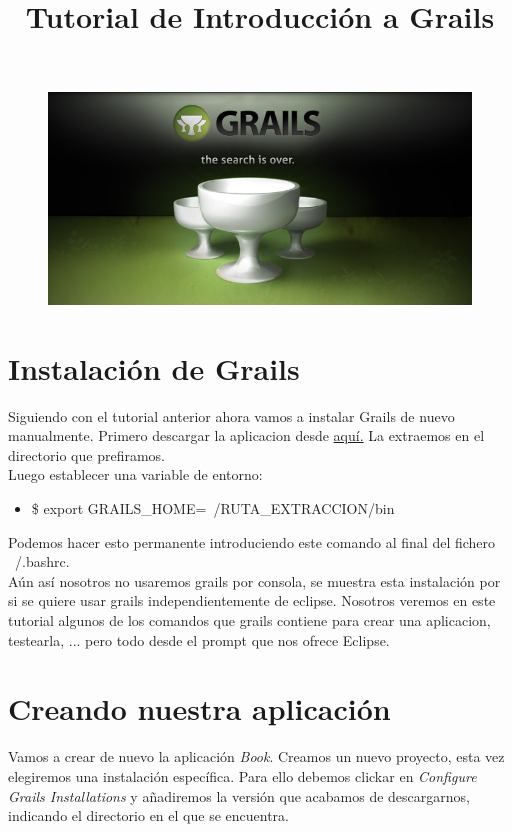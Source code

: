 \documentclass[a4paper,12pt,spanish]{article}
\title{Tutorial de Introducción a Grails}
\begin{document}
\begin{titlepage}
  \maketitle
  \begin{figure}[h!]
    \centering
    \vspace{1in}
    \includegraphics[scale=0.65]{grailsportada}
    \label{fig:Portada}
  \end{figure}
\end{titlepage}
 
\tableofcontents
\newpage 

\section{Instalación de Grails}
Siguiendo con el tutorial anterior ahora vamos a instalar Grails de nuevo manualmente. Primero descargar la aplicacion desde \href{http://grails.org/Download}{aquí.} La extraemos en el directorio que prefiramos.\\

Luego establecer una variable de entorno:
\begin{itemize}
\item \$ export GRAILS\_HOME=~/RUTA\_EXTRACCION/bin
\end{itemize}

Podemos hacer esto permanente introduciendo este comando al final del fichero ~/.bashrc.\\

Aún así nosotros no usaremos grails por consola, se muestra esta instalación por si se quiere usar grails independientemente de eclipse. Nosotros veremos en este tutorial algunos de los comandos que grails contiene para crear una aplicacion, testearla, ... pero todo desde el prompt que nos ofrece Eclipse.

\section{Creando nuestra aplicación}
Vamos a crear de nuevo la aplicación {\it Book}. Creamos un nuevo proyecto, esta vez elegiremos una instalación específica. Para ello debemos clickar en {\it Configure Grails Installations} y añadiremos la versión que acabamos de descargarnos, indicando el directorio en el que se encuentra.\\
\end{document}
